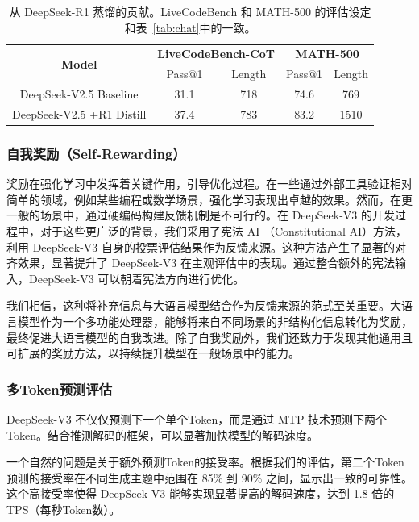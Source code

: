 \documentclass[lang=cn,a4paper,newtx]{elegantpaper}
\newcommand{\dsviii}{DeepSeek-V3}
\begin{document}
\begin{table}[t]
    \centering
    \begin{tabular}{c|cc|cc}
    \toprule
    \multirow{2}{*}{\textbf{Model}} & \multicolumn{2}{c}{\textbf{LiveCodeBench-CoT}} & \multicolumn{2}{c}{\textbf{MATH-500}} \\

     & Pass@1 & Length & Pass@1 & Length\\
    \midrule
     DeepSeek-V2.5 Baseline & 31.1 & 718 & 74.6 & 769\\
     DeepSeek-V2.5 +R1 Distill & 37.4 & 783 &83.2& 1510\\
    \bottomrule
    \end{tabular}
    \caption{从 DeepSeek-R1 蒸馏的贡献。LiveCodeBench 和 MATH-500 的评估设定和表~\ref{tab:chat}中的一致。}
    \label{tab:distill} 
\end{table}

\subsubsection{自我奖励（Self-Rewarding）}

奖励在强化学习中发挥着关键作用，引导优化过程。在一些通过外部工具验证相对简单的领域，例如某些编程或数学场景，强化学习表现出卓越的效果。然而，在更一般的场景中，通过硬编码构建反馈机制是不可行的。在 \dsviii{} 的开发过程中，对于这些更广泛的背景，我们采用了宪法 AI （Constitutional AI）方法，利用 \dsviii{} 自身的投票评估结果作为反馈来源。这种方法产生了显著的对齐效果，显著提升了 \dsviii{} 在主观评估中的表现。通过整合额外的宪法输入，\dsviii{} 可以朝着宪法方向进行优化。

我们相信，这种将补充信息与大语言模型结合作为反馈来源的范式至关重要。大语言模型作为一个多功能处理器，能够将来自不同场景的非结构化信息转化为奖励，最终促进大语言模型的自我改进。除了自我奖励外，我们还致力于发现其他通用且可扩展的奖励方法，以持续提升模型在一般场景中的能力。

\subsubsection{多Token预测评估}

\dsviii{} 不仅仅预测下一个单个Token，而是通过 MTP 技术预测下两个Token。结合推测解码的框架，可以显著加快模型的解码速度。

一个自然的问题是关于额外预测Token的接受率。根据我们的评估，第二个Token预测的接受率在不同生成主题中范围在 85\% 到 90\% 之间，显示出一致的可靠性。这个高接受率使得 \dsviii{} 能够实现显著提高的解码速度，达到 1.8 倍的 TPS（每秒Token数）。
\end{document}
